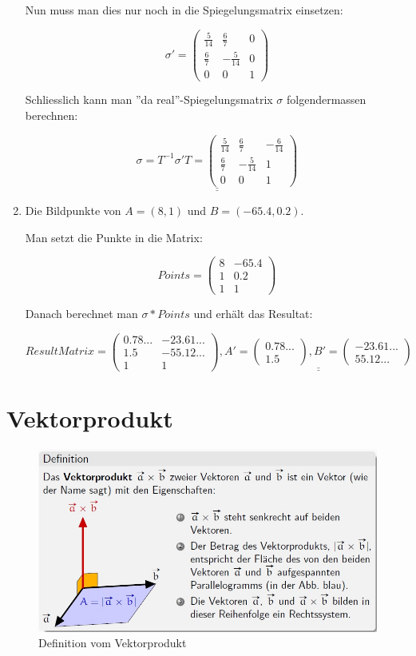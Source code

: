 \begin{enumerate}
Nun muss man dies nur noch in die Spiegelungsmatrix einsetzen:

\[
\sigma' = 
\begin{pmatrix}
\frac{5}{14} & \frac{6}{7} & 0\\
\frac{6}{7} & -\frac{5}{14} & 0\\
0 & 0 & 1
\end{pmatrix}
\]

Schliesslich kann man ''da real''-Spiegelungsmatrix $\sigma$ folgendermassen berechnen:

\[
\underline{\underline{\sigma = T^{-1}\sigma' T = 
\begin{pmatrix}
\frac{5}{14} & \frac{6}{7} & -\frac{6}{14}\\
\frac{6}{7} & -\frac{5}{14} & 1\\
0 & 0 & 1
\end{pmatrix}}}
\]

\item Die Bildpunkte von $A = (8, 1)$ und $B=(-65.4, 0.2)$.

Man setzt die Punkte in die Matrix:

\[
Points = \begin{pmatrix}
8 & -65.4 \\
1 & 0.2 \\
1 & 1
\end{pmatrix}
\]

Danach berechnet man $\sigma * Points$ und erhält das Resultat:

\[
ResultMatrix = \begin{pmatrix}
0.78... & -23.61... \\
1.5 & -55.12... \\
1 & 1
\end{pmatrix}, 
\underline{\underline{A' = 
\begin{pmatrix}
0.78...\\
1.5 
\end{pmatrix}, B' = 
\begin{pmatrix}
-23.61... \\
55.12... 
\end{pmatrix}}}
\]

\end{enumerate}

\section{Vektorprodukt}

\begin{figure}[!ht]
	\centering
	\includegraphics[width=0.7\linewidth]{fig/vektorprodukt_definition}
	\caption{Definition vom Vektorprodukt}
	\label{fig:vektorprodukt_definition}
\end{figure}

